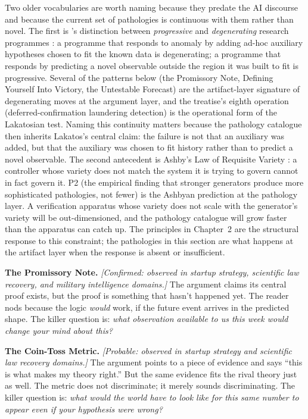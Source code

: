 \documentclass[11pt]{article}
\begin{document}
Two older vocabularies are worth naming because they predate the AI discourse and because the current set of pathologies is continuous with them rather than novel. The first is \citeauthor{lakatos1978}'s distinction between \emph{progressive} and \emph{degenerating} research programmes \citep{lakatos1978}: a programme that responds to anomaly by adding ad-hoc auxiliary hypotheses chosen to fit the known data is degenerating; a programme that responds by predicting a novel observable outside the region it was built to fit is progressive. Several of the patterns below (the Promissory Note, Defining Yourself Into Victory, the Untestable Forecast) are the artifact-layer signature of degenerating moves at the argument layer, and the treatise's eighth operation (deferred-confirmation laundering detection) is the operational form of the Lakatosian test. Naming this continuity matters because the pathology catalogue then inherits Lakatos's central claim: the failure is not that an auxiliary was added, but that the auxiliary was chosen to fit history rather than to predict a novel observable. The second antecedent is Ashby's Law of Requisite Variety \citep{ashby1956}: a controller whose variety does not match the system it is trying to govern cannot in fact govern it. P2 (the empirical finding that stronger generators produce more sophisticated pathologies, not fewer) is the Ashbyan prediction at the pathology layer. A verification apparatus whose variety does not scale with the generator's variety will be out-dimensioned, and the pathology catalogue will grow faster than the apparatus can catch up. The principles in Chapter~2 are the structural response to this constraint; the pathologies in this section are what happens at the artifact layer when the response is absent or insufficient.

\textbf{The Promissory Note.} \emph{[Confirmed: observed in startup strategy, scientific law recovery, and military intelligence domains.]} The argument claims its central proof exists, but the proof is something that hasn't happened yet. The reader nods because the logic \emph{would} work, if the future event arrives in the predicted shape. The killer question is: \emph{what observation available to us this week would change your mind about this?}

\textbf{The Coin-Toss Metric.} \emph{[Probable: observed in startup strategy and scientific law recovery domains.]} The argument points to a piece of evidence and says ``this is what makes my theory right.'' But the same evidence fits the rival theory just as well. The metric does not discriminate; it merely sounds discriminating. The killer question is: \emph{what would the world have to look like for this same number to appear even if your hypothesis were wrong?}
\end{document}
